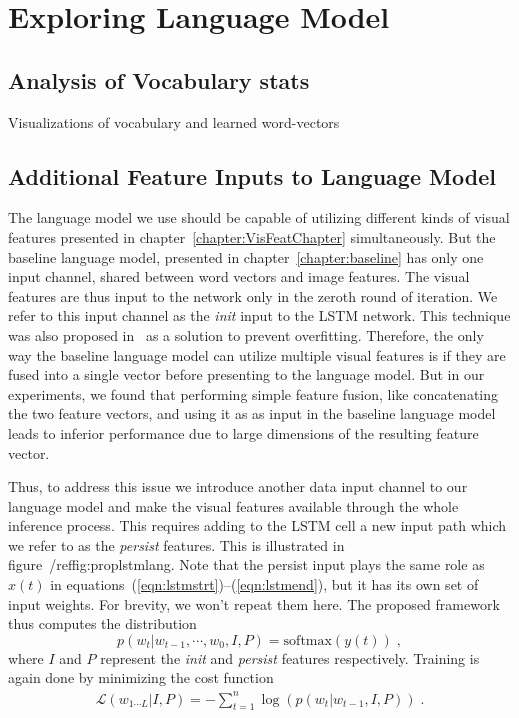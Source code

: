 \chapter{Exploring Language Model}
\label{chapter:langModel}
\section{Analysis of Vocabulary stats}
Visualizations of vocabulary and learned word-vectors

\section{Additional Feature Inputs to Language Model}
The language model we use should be capable of utilizing different kinds of
visual features presented in chapter~\ref{chapter:VisFeatChapter}
simultaneously.
But the baseline language model, presented in chapter~\ref{chapter:baseline} has
only one input channel, shared between word vectors and image features.
The visual features are thus input to the network only in the zeroth
round of iteration.
We refer to this input channel as the \emph{init} input to the LSTM network.
This technique was also proposed in~\cite{Vinyals_2015_CVPR} as a solution to
prevent overfitting. 
Therefore, the only way the baseline language model can utilize multiple visual
features is if they are fused into a single vector before presenting to the
language model.
But in our experiments, we found that performing simple feature fusion, like
concatenating the two feature vectors, and using it as as input in the baseline
language model leads to inferior performance due to large dimensions of the
resulting feature vector.

Thus, to address this issue we introduce another data input channel to our
language model and make the visual features available through the whole
inference process.
This requires adding to the LSTM cell a new input path which we refer to as the
\emph{persist} features.
This is illustrated in figure~/ref{fig:proplstmlang}.
Note that the persist input plays the same role as $x(t)$ in
equations~(\ref{eqn:lstmstrt})--(\ref{eqn:lstmend}), but it has its own set of
input weights.
For brevity, we won't repeat them here.
The proposed framework thus computes the distribution
\begin{equation}
p(w_t | w_{t-1},\cdots,w_0, I, P) = \text{softmax}(y(t)) \;,
\end{equation}
\noindent where $I$ and $P$ represent the \emph{init} and \emph{persist}
features respectively.
Training is again done by minimizing the cost function
\begin{align}
  \mathcal{L}(w_{1\cdots L} | I,P) = -\sum_{t=1}^n \log(p(w_t|w_{t-1},I,P)) \; .
\end{align}


